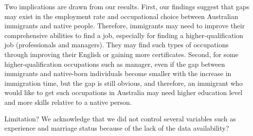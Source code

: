 Two implications are drawn from our results.
First, our findings suggest that gaps may exist in the employment rate and occupational choice between Australian immigrants and native people. Therefore, immigrants may need to improve their comprehensive abilities to find a job, especially for finding a higher-qualification job (professionals and managers). They may find such types of occupations through improving their English or gaining more certificates.
Second, for some higher-qualification occupations such as manager, even if the gap between immigrants and native-born individuals become smaller with the increase in immigration time, but the gap is still obvious, and therefore, an immigrant who would like to get such occupations in Australia may need higher education level and more skills relative to a native person.

Limitation? We acknowledge that we did not control several variables such as experience and marriage status because of the lack of the data availability?